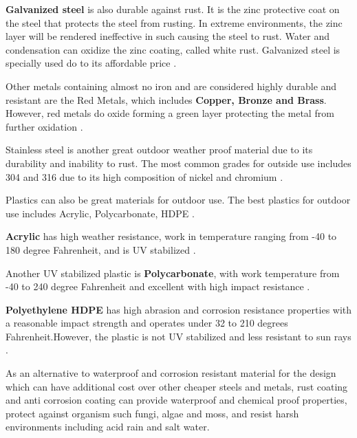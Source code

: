 \textbf{Galvanized steel} is also durable against rust. It is the zinc protective coat on the steel that protects the steel from rusting. In extreme environments, the zinc layer will be rendered ineffective in such causing the steel to rust. Water and condensation can oxidize the zinc coating, called white rust. Galvanized steel is specially used do to its affordable price \cite{media_metals_2018}\cite{form_best_nodate}\cite{noauthor_4_2018}.

Other metals containing almost no iron and are considered highly durable and resistant are the Red Metals, which includes \textbf{Copper, Bronze and Brass}. However, red metals do oxide forming a green layer protecting the metal from further oxidation \cite{media_metals_2018}\cite{form_best_nodate}\cite{noauthor_4_2018}.

Stainless steel is another great outdoor weather proof material due to its durability and inability to rust. The most common grades for outside use includes 304 and 316 due to its high composition of nickel and chromium \cite{media_metals_2018}\cite{form_best_nodate}\cite{noauthor_4_2018}.

Plastics can also be great materials for outdoor use. The best plastics for outdoor use includes Acrylic, Polycarbonate, HDPE \cite{noauthor_uv_nodate}\cite{marla_acme_best_2019}. 

\textbf{Acrylic} has high weather resistance, work in temperature ranging from -40 to 180 degree Fahrenheit, and is UV stabilized \cite{noauthor_uv_nodate}\cite{marla_acme_best_2019}.

Another UV stabilized plastic is \textbf{Polycarbonate}, with work temperature from -40 to 240 degree Fahrenheit and excellent with high impact resistance \cite{noauthor_uv_nodate}\cite{marla_acme_best_2019}.

\textbf{Polyethylene HDPE} has high abrasion and corrosion resistance properties with a reasonable impact strength and operates under 32 to 210 degrees Fahrenheit.However, the plastic is not UV stabilized and less resistant to sun rays \cite{noauthor_uv_nodate}\cite{marla_acme_best_2019}.  

As an alternative to waterproof and corrosion resistant material for the design which can have additional cost over other cheaper steels and metals, rust coating and anti corrosion coating can provide waterproof and chemical proof properties, protect against organism such fungi, algae and moss, and resist harsh environments including acid rain and salt water.

